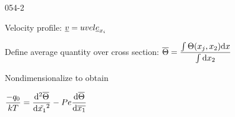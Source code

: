 \begin{mitframe}{054-2}

\begin{listone}
	\item Velocity profile: $\uline{\vvel}=uvel\mcef_{\specfrac{i}}$
    \item Define average quantity over cross section: $\overline{\dimltemp}=\dfrac{\int\dimltemp(\specfrac{j}, \specfrac{2})\mathrm{d}\disp}{\int\mathrm{d}\disp_{2}}$
    \item Nondimensionalize to obtain
    		\begin{listtwo}
            	\item $\dfrac{-\heatflux_{0}}{\thermcond\Temp}=\dfrac{\mathrm{d}^2\overline{\dimltemp}}{\mathrm{d}\tilde{\disp_{1}}^2}-\peclet\dfrac{\mathrm{d}\overline{\dimltemp}}{\mathrm{d}\overline{\disp_{1}}}$
            \end{listtwo}
\end{listone}
\end{mitframe}